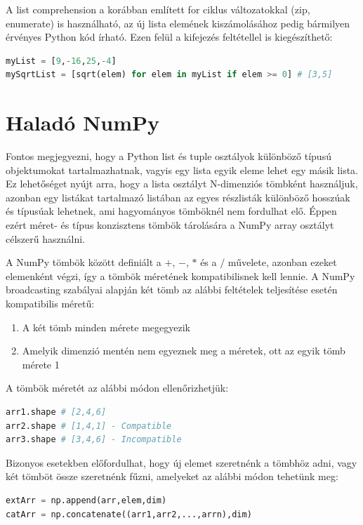 \documentclass[12pt,a4paper,oneside]{report}             %
\begin{document}
A list comprehension a korábban említett for ciklus változatokkal (zip, enumerate) is használható, az új lista elemének kiszámolásához pedig bármilyen érvényes Python kód írható. Ezen felül a kifejezés feltétellel is kiegészíthető:

\begin{lstlisting}[language=Python]
myList = [9,-16,25,-4]
mySqrtList = [sqrt(elem) for elem in myList if elem >= 0] # [3,5]
\end{lstlisting}

\section{Haladó NumPy}

Fontos megjegyezni, hogy a Python list és tuple osztályok különböző típusú objektumokat tartalmazhatnak, vagyis egy lista egyik eleme lehet egy másik lista. Ez lehetőséget nyújt arra, hogy a lista osztályt N-dimenziós tömbként használjuk, azonban egy listákat tartalmazó listában az egyes részlisták különböző hosszúak és típusúak lehetnek, ami hagyományos tömböknél nem fordulhat elő. Éppen ezért méret- és típus konzisztens tömbök tárolására a NumPy array osztályt célszerű használni.

A NumPy tömbök között definiált a $+$, $-$, $*$ és a $/$ művelete, azonban ezeket elemenként végzi, így a tömbök méretének kompatibilisnek kell lennie. A NumPy broadcasting szabályai alapján két tömb az alábbi feltételek teljesítése esetén kompatibilis méretű:

\begin{enumerate}
	\item A két tömb minden mérete megegyezik
	\item Amelyik dimenzió mentén nem egyeznek meg a méretek, ott az egyik tömb mérete 1
\end{enumerate}

A tömbök méretét az alábbi módon ellenőrizhetjük:

\begin{lstlisting}[language=Python]
arr1.shape # [2,4,6]
arr2.shape # [1,4,1] - Compatible
arr3.shape # [3,4,6] - Incompatible
\end{lstlisting}

Bizonyos esetekben előfordulhat, hogy új elemet szeretnénk a tömbhöz adni, vagy két tömböt össze szeretnénk fűzni, amelyeket az alábbi módon tehetünk meg:

\begin{lstlisting}[language=Python]
extArr = np.append(arr,elem,dim)
catArr = np.concatenate((arr1,arr2,...,arrn),dim)
\end{lstlisting}
\end{document}
